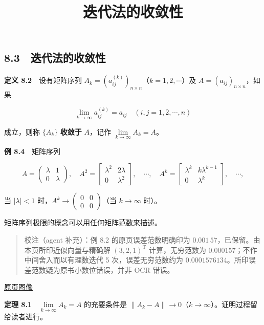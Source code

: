 \documentclass[
  10pt,
  fontset=fandol]{ctexart}
\title{迭代法的收敛性}
\author{}
\date{}
\begin{document}
\maketitle

\subsection{8.3　迭代法的收敛性}\label{ux8fedux4ee3ux6cd5ux7684ux6536ux655bux6027}

\textbf{定义 8.2}　设有矩阵序列 \(A_k=(a_{ij}^{(k)})_{n\times n}\)（\(k=1,2,\cdots\)）及 \(A=(a_{ij})_{n\times n}\)，如果

\[
\lim_{k\to\infty}a_{ij}^{(k)}=a_{ij}\quad(i,j=1,2,\cdots,n)
\]

成立，则称 \(\{A_k\}\) \textbf{收敛于} \(A\)，记作 \(\lim\limits_{k\to\infty}A_k=A\)。

\textbf{例 8.4}　矩阵序列

\[
A=\begin{pmatrix}\lambda&1\\0&\lambda\end{pmatrix},\quad
A^2=\begin{bmatrix}\lambda^2&2\lambda\\0&\lambda^2\end{bmatrix},\quad\cdots,\quad
A^k=\begin{bmatrix}\lambda^k&k\lambda^{k-1}\\0&\lambda^k\end{bmatrix},\quad\cdots,
\]

当 \(|\lambda|<1\) 时，\(A^k\to\begin{pmatrix}0&0\\0&0\end{pmatrix}\)（当 \(k\to\infty\) 时）。

矩阵序列极限的概念可以用任何矩阵范数来描述。

\begin{quote}
校注（agent 补充）：例 8.2 的原页误差范数明确印为 \(0.001\,57\)，已保留。由本页所印近似向量与精确解 \((3,2,1)^{\mathrm T}\) 计算，无穷范数为 \(0.000157\)；不作中间舍入而以有理数迭代 5 次，误差无穷范数约为 \(0.0001576134\)。所印误差范数疑为原书小数位错误，并非 OCR 错误。
\end{quote}

\href{../../source-images/pdf-220.jpeg}{原页图像}

\textbf{定理 8.1}　\(\lim\limits_{k\to\infty}A_k=A\) 的充要条件是 \(\|A_k-A\|\to0\)（\(k\to\infty\)）。证明过程留给读者进行。
\end{document}
